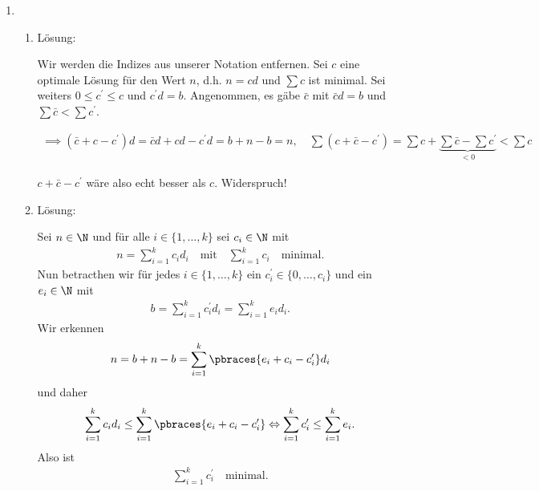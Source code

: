 
\begin{solution}

\phantom{}

\begin{enumerate}[label = \alph*]

  \item
  
  \begin{enumerate}[label = \arabic*.]

    \item Lösung:
    
    Wir werden die Indizes aus unserer Notation entfernen.
    Sei $c$ eine optimale Lösung für den Wert $n$, d.h. $n = c d$ und $\sum c$ ist minimal.
    Sei weiters $0 \leq c^\prime \leq c$ und $c^\prime d = b$.
    Angenommen, es gäbe $\bar c$ mit $\bar c d = b$ und $\sum \bar c < \sum c^\prime$.

    \begin{align*}
      \implies
      (\bar c + c - c^\prime) d
      =
      \bar c d + c d - c^\prime d
      =
      b + n - b
      =
      n,
      \quad
      \sum (c + \bar c - c^\prime)
      =
      \sum c + \underbrace{\sum \bar c - \sum c^\prime}_{< 0}
      <
      \sum c
    \end{align*}

    $c + \bar c - c^\prime$ wäre also echt besser als $c$.
    Widerspruch!

    \item Lösung:
    
    Sei $n \in \N$ und für alle $i \in \{1, \dots, k\}$ sei $c_i \in \N$ mit
    \begin{align*}
      n = \sum_{i = 1}^k c_i d_i \quad \text{mit} \quad \sum_{i = 1}^k c_i \quad \text{minimal.}
    \end{align*}
    Nun betracthen wir für jedes $i \in \{1, \dots, k\}$ ein $c_i^\prime \in \{0, \dots, c_i\}$ und ein $e_i \in \N$ mit
    \begin{align*}
      b = \sum_{i = 1}^k c_i^\prime d_i = \sum_{i = 1}^k e_i d_i.
    \end{align*}
    Wir erkennen 
    \begin{align*}
      n = b + n - b = \sum_{i = 1}^k \pbraces{e_i + c_i - c_i^\prime} d_i
    \end{align*}
    und daher
    \begin{align*}
      \sum_{i = 1}^k c_i d_i \leq \sum_{i = 1}^k \pbraces{e_i + c_i - c_i^\prime}  \Leftrightarrow \sum_{i = 1}^k c_i^\prime \leq \sum_{i = 1}^k e_i.
    \end{align*}
    Also ist 
    \begin{align*}
       \sum_{i = 1}^k c_i^\prime \quad \text{minimal.}
    \end{align*}


\end{enumerate}
\end{enumerate}
\end{solution}
